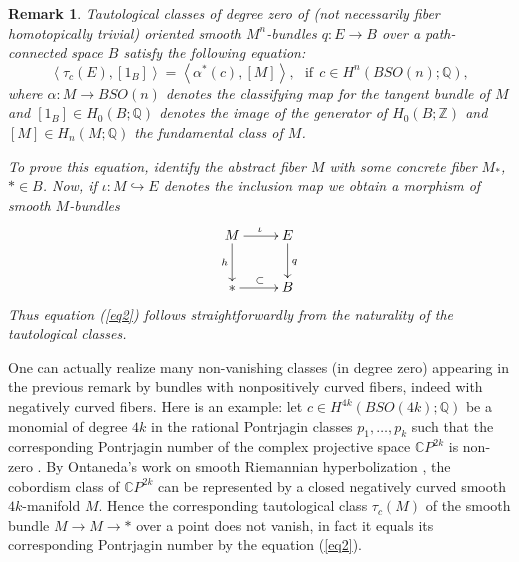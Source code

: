 \documentclass[onecolumn,notitlepage,11pt]{article}
\newcommand{\refer}[1]{\hyperref[#1]{\ref*{#1}}}%
\newcommand{\C}{\mathbb{C}}
\newcommand{\Z}{\mathbb{Z}}
\newcommand{\Q}{\mathbb{Q}}
\newcommand{\bra}{\left\langle}
\newcommand{\ket}{\right\rangle}
\newcommand{\beq}{\begin{equation*}}
\newcommand{\eeq}{\end{equation*}}
\newtheorem{coro}{Corollary}[thm]
\newtheorem{rmk}{Remark}
\theoremstyle{definition}
\begin{document}
\begin{rmk}
Tautological classes of degree zero of
(not necessarily fiber homotopically trivial) oriented 
smooth $M^n$-bundles
$q:E\to B$ over a path-connected space $B$ satisfy
the following equation:
\begin{equation}\label{eq2}
\bra\tau_{c}(E),[1_B]\ket=\bra\alpha^*(c),[M]\ket,\ \ \ \text{if}\ \  c\in H^n(BSO(n);\Q),
\end{equation}
where 
$\alpha:M\to BSO(n)$ denotes the classifying map
 for the tangent bundle
of $M$ and $[1_B]\in H_0(B;\Q)$ denotes the image of 
the generator of $H_0(B;\Z)$ and $[M]\in H_n(M;\Q)$ the fundamental
class of $M$. 

To prove this equation, identify the abstract fiber $M$ with some
concrete fiber $M_{\ast}$, $\ast\in B$. Now, if
$\iota:M\hookrightarrow E$ denotes the inclusion map we
obtain a morphism of smooth $M$-bundles
\beq
\xymatrix{
M\ar[r]^{\iota}\ar[d]_{h} & E\ar[d]^{q}\\
\ast\ar[r]^{\subset}&B
}
\eeq
Thus equation (\ref{eq2}) follows straightforwardly from
the naturality of the tautological classes.

\end{rmk}
One can actually realize many non-vanishing classes (in degree zero)
appearing in the
previous remark by bundles with nonpositively curved fibers, indeed
with negatively curved fibers. Here is an example: let
$c\in H^{4k}(BSO(4k);\Q)$
be a monomial of degree $4k$ in the rational Pontrjagin classes
$p_1,\ldots, p_{k}$ such that the corresponding 
Pontrjagin number of the 
complex projective space $\C P^{2k}$ 
is non-zero \cite[p.194]{milnor}.
By Ontaneda's work on smooth Riemannian
hyperbolization \cite{pedro}, the 
cobordism class of $\C P^{2k}$ can
be represented by a closed negatively
curved smooth $4k$-manifold $M$. Hence
the corresponding tautological class $\tau_c(M)$ of the smooth bundle $M\to M\to\ast$ over a point does not vanish, in fact it equals its corresponding Pontrjagin number by the equation (\ref{eq2}). 
\end{document}
